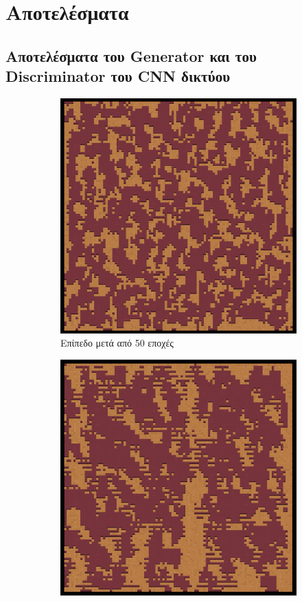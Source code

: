 \section{Αποτελέσματα}

\subsection{Αποτελέσματα του Generator και του Discriminator του CNN δικτύου}
\begin{figure}[H]
\begin{subfigure}{.5\textwidth}
  \centering
  \includegraphics[width=.8\linewidth]{../images/generated/50.png}
  \caption{Επίπεδο μετά από 50 εποχές}
  \label{fig:sfig1}
\end{subfigure}%
\begin{subfigure}{.5\textwidth}
  \centering
  \includegraphics[width=.8\linewidth]{../images/generated/100.png}

\end{subfigure}
\end{figure}
